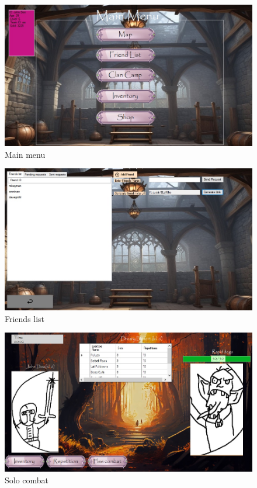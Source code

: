 \begin{figure}[!htb]
  \centering
    \centering
    \includegraphics[width=\textwidth]{mockup3.jpg}
    \caption{Main menu}
    \label{}
\end{figure}
\begin{figure}[!htb]
  \centering
    \centering
    \includegraphics[width=\textwidth]{mockup4.jpg}
    \caption{Friends list}
    \label{}
\end{figure}
\begin{figure}[!htb]
  \centering
    \centering
    \includegraphics[width=\textwidth]{mockup5.jpg}
    \caption{Solo combat}
    \label{}
\end{figure}
